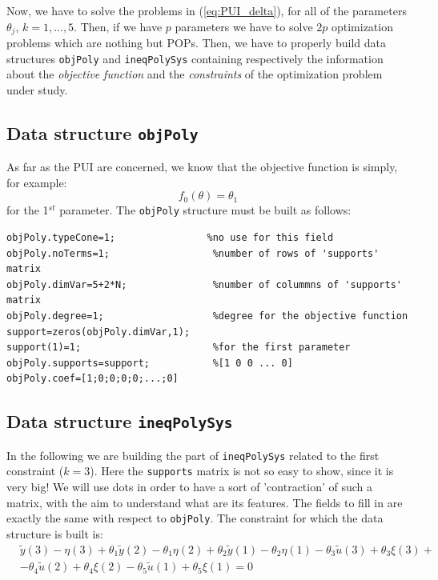 \noindent
Now, we have to solve the problems in (\ref{eq:PUI_delta}), for all of the parameters $\theta_j$, $k=1,...,5$. Then, if we have $p$ parameters we have to solve $2p$ optimization problems which are nothing but POPs. Then, we have to properly build data structures \texttt{objPoly} and \texttt{ineqPolySys} containing respectively the information about the \textit{objective function} and the \textit{constraints} of the optimization problem under study.

\subsection{Data structure \texttt{objPoly}}
As far as the PUI are concerned, we know that the objective function is simply, for example:
\begin{equation}
    f_0(\theta)=\theta_1
\end{equation} for the 1$^{st}$ parameter. The \texttt{objPoly} structure must be built as follows:
\begin{verbatim}
objPoly.typeCone=1;                %no use for this field
objPoly.noTerms=1;                  %number of rows of 'supports' matrix
objPoly.dimVar=5+2*N;               %number of colummns of 'supports' matrix
objPoly.degree=1;                   %degree for the objective function
support=zeros(objPoly.dimVar,1);
support(1)=1;                       %for the first parameter
objPoly.supports=support;           %[1 0 0 ... 0]
objPoly.coef=[1;0;0;0;0;...;0]
\end{verbatim}

\subsection{Data structure \texttt{ineqPolySys}}
In the following we are building the part of \texttt{ineqPolySys} related to the first constraint ($k=3$). Here the \texttt{supports} matrix is not so easy to show, since it is very big! We will use dots in order to have a sort of 'contraction' of such a matrix, with the aim to understand what are its features. The fields to fill in are exactly the same with respect to \texttt{objPoly}. The constraint for which the data structure is built is:
\begin{equation}
    \begin{aligned}
        &\tilde{y}(3) - \eta(3) +\theta_1\tilde{y}(2)-\theta_1\eta(2) +\theta_2\tilde{y}(1)-\theta_2\eta(1)-\theta_3\tilde{u}(3)+\theta_3\xi(3)+ \\
            &-\theta_4\tilde{u}(2)+\theta_4\xi(2) -\theta_5\tilde{u}(1)+\theta_5\xi(1)=0
    \end{aligned}
\end{equation}

